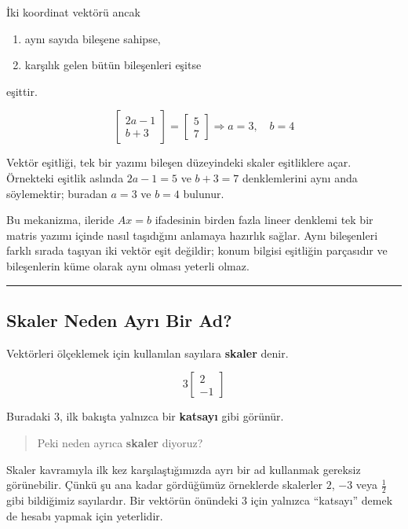 \documentclass[
  a4paper,
  DIV=11,
  numbers=noendperiod]{scrartcl}
\providecommand{\tightlist}{%
  \setlength{\itemsep}{0pt}\setlength{\parskip}{0pt}}
\begin{document}
İki koordinat vektörü ancak

\begin{enumerate}
\def\labelenumi{\arabic{enumi}.}
\tightlist
\item
  aynı sayıda bileşene sahipse,
\item
  karşılık gelen bütün bileşenleri eşitse
\end{enumerate}

eşittir.

\[
\begin{bmatrix}2a-1\\b+3\end{bmatrix}
=
\begin{bmatrix}5\\7\end{bmatrix}
\Longrightarrow
a=3,\quad b=4
\]

Vektör eşitliği, tek bir yazımı bileşen düzeyindeki skaler eşitliklere
açar. Örnekteki eşitlik aslında \(2a-1=5\) ve \(b+3=7\) denklemlerini
aynı anda söylemektir; buradan \(a=3\) ve \(b=4\) bulunur.

Bu mekanizma, ileride \(Ax=b\) ifadesinin birden fazla lineer denklemi
tek bir matris yazımı içinde nasıl taşıdığını anlamaya hazırlık sağlar.
Aynı bileşenleri farklı sırada taşıyan iki vektör eşit değildir; konum
bilgisi eşitliğin parçasıdır ve bileşenlerin küme olarak aynı olması
yeterli olmaz.

\begin{center}\rule{0.5\linewidth}{0.5pt}\end{center}

\subsection{Skaler Neden Ayrı Bir
Ad?}\label{skaler-neden-ayrux131-bir-ad}

Vektörleri ölçeklemek için kullanılan sayılara \textbf{skaler} denir.

\[
3
\begin{bmatrix}
2\\
-1
\end{bmatrix}
\]

Buradaki \(3\), ilk bakışta yalnızca bir \textbf{katsayı} gibi görünür.

\begin{quote}
Peki neden ayrıca \textbf{skaler} diyoruz?
\end{quote}

Skaler kavramıyla ilk kez karşılaştığımızda ayrı bir ad kullanmak
gereksiz görünebilir. Çünkü şu ana kadar gördüğümüz örneklerde skalerler
\(2\), \(-3\) veya \(\frac12\) gibi bildiğimiz sayılardır. Bir vektörün
önündeki \(3\) için yalnızca ``katsayı'' demek de hesabı yapmak için
yeterlidir.
\end{document}
